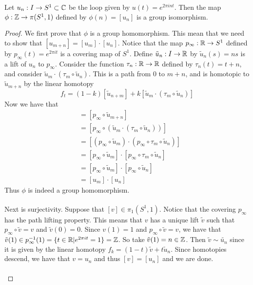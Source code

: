 \documentclass[a4paper]{article}
\begin{document}
\begin{thm}{}{} Let $u_n:I\to S^1\subset\mathbb{C}$ be the loop given by $u(t)=e^{2\pi int}$. Then the map $\phi:\mathbb{Z}\to\pi(S^1,1)$ defined by $\phi(n)=[u_n]$ is a group isomorphism. \tcbline
\begin{proof}
We first prove that $\phi$ is a group homomorphism. This mean that we need to show that $[u_{m+n}]=[u_m]\cdot[u_n]$. Notice that the map $p_\infty:\mathbb{R}\to S^1$ defined by $p_\infty(t)=e^{2\pi it}$ is a covering map of $S^1$. Define $\tilde{u}_n:I\to\mathbb{R}$ by $\tilde{u}_n(s)=ns$ is a lift of $u_n$ to $p_\infty$. Consider the function $\tau_n:\mathbb{R}\to\mathbb{R}$ defined by $\tau_n(t)=t+n$, and consider $\tilde{u}_m\cdot(\tau_m\circ\tilde{u}_n)$. This is a path from $0$ to $m+n$, and is homotopic to $\tilde{u}_{m+n}$ by the linear homotopy $$f_t=(1-k)[\tilde{u}_{n+m}]+k[\tilde{u}_m\cdot(\tau_m\circ\tilde{u}_n)]$$ Now we have that 
\begin{align*}
[u_{m+n}]&=[p_\infty\circ\tilde{u}_{m+n}]\tag{Lift of $u$}\\
&=[p_\infty\circ(\tilde{u}_m\cdot(\tau_m\circ\tilde{u}_n))]\tag{Homotopies descend}\\
&=[(p_\infty\circ\tilde{u}_m)\cdot(p_\infty\circ\tau_m\circ\tilde{u}_n)]\tag{Paths descend}\\
&=[p_\infty\circ\tilde{u}_m]\cdot[p_\infty\circ\tau_m\circ\tilde{u}_n]\\
&=[p_\infty\circ\tilde{u}_m]\cdot[p_\infty\circ\tilde{u}_n]\tag{Deck Transformation}\\
&=[u_m]\cdot[u_n]\tag{Lift of $u$}
\end{align*}
Thus $\phi$ is indeed a group homomorphism. \\~\\

Next is surjectivity. Suppose that $[v]\in\pi_1(S^1,1)$. Notice that the covering $p_\infty$ has the path lifting property. This means that $v$ has a unique lift $\tilde{v}$ such that $p_\infty\circ\tilde{v}=v$ and $\tilde{v}(0)=0$. Since $v(1)=1$ and $p_\infty\circ\tilde{v}=v$, we have that $\tilde{v}(1)\in p_\infty^{-1}(1)=\{t\in\mathbb{R}|e^{2\pi it}=1\}=\mathbb{Z}$. So take $\tilde{v}(1)=n\in\mathbb{Z}$. Then $\tilde{v}\sim\tilde{u_n}$ since it is given by the linear homotopy $f_k=(1-t)\tilde{v}+t\tilde{u}_n$. Since homotopies descend, we have that $v=u_n$ and thus $[v]=[u_n]$ and we are done. \\~\\


\end{proof}
\end{thm}
\end{document}
